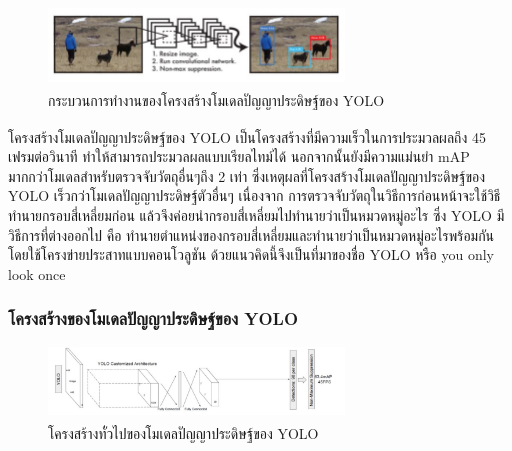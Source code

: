 \begin{figure}[!ht]
    \centering
    \includegraphics[width=0.7\textwidth]{chapter2/images/yolo.jpg}
    \caption[กระบวนการทำงานของโครงสร้างโมเดลปัญญาประดิษฐ์ของ YOLO]{กระบวนการทำงานของโครงสร้างโมเดลปัญญาประดิษฐ์ของ YOLO\textsuperscript{\cite{yolo}}}
    \label{fig:yolo}
\end{figure}

โครงสร้างโมเดลปัญญาประดิษฐ์ของ YOLO\textsuperscript{\cite{yolo}} เป็นโครงสร้างที่มีความเร็วในการประมวลผลถึง 45 เฟรมต่อวินาที ทำให้สามารถประมวลผลแบบเรียลไทม์ได้ นอกจากนั้นยังมีความแม่นยำ mAP 
มากกว่าโมเดลสำหรับตรวจจับวัตถุอื่นๆถึง 2 เท่า ซึ่งเหตุผลที่โครงสร้างโมเดลปัญญาประดิษฐ์ของ YOLO เร็วกว่าโมเดลปัญญาประดิษฐ์ตัวอื่นๆ เนื่องจาก
การตรวจจับวัตถุในวิธีการก่อนหน้าจะใช้วิธีทำนายกรอบสี่เหลี่ยมก่อน แล้วจึงค่อยนำกรอบสี่เหลี่ยมไปทำนายว่าเป็นหมวดหมู่อะไร ซึ่ง YOLO มีวิธีการที่ต่างออกไป คือ 
ทำนายตำแหน่งของกรอบสี่เหลี่ยมและทำนายว่าเป็นหมวดหมู่อะไรพร้อมกัน โดยใช้โครงข่ายประสาทแบบคอนโวลูชัน ด้วยแนวคิดนี้จึงเป็นที่มาของชื่อ YOLO 
หรือ you only look once
\subsubsection*{โครงสร้างของโมเดลปัญญาประดิษฐ์ของ YOLO} 
\begin{figure}[!ht]
    \centering
    \includegraphics[width=0.7\textwidth]{chapter2/images/yolo_architecture.jpg}
    \caption[โครงสร้างทั่วไปของโมเดลปัญญาประดิษฐ์ของ YOLO]{โครงสร้างทั่วไปของโมเดลปัญญาประดิษฐ์ของ YOLO\textsuperscript{\cite{ssd_yolo_pic}}}
    \label{fig:yolo_architecture}
\end{figure}

